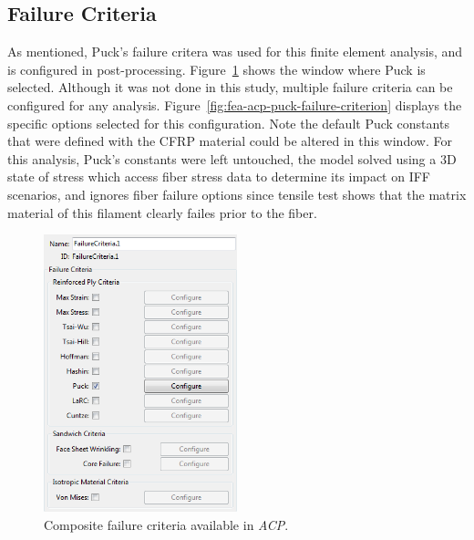 \clearpage

\subsection{Failure Criteria}

\indent

As mentioned, Puck's failure critera was used for this finite element analysis, and is configured in post-processing. Figure~\ref{fig:fea-acp-failure-criteria-definition} shows the window where Puck is selected. Although it was not done in this study, multiple failure criteria can be configured for any analysis. Figure~\ref{fig:fea-acp-puck-failure-criterion} displays the specific options selected for this configuration. Note the default Puck constants that were defined with the CFRP material could be altered in this window. For this analysis, Puck's constants were left untouched, the model solved using a 3D state of stress which access fiber stress data to determine its impact on IFF scenarios, and ignores fiber failure options since tensile test shows that the matrix material of this filament clearly failes prior to the fiber.\\

\begin{figure}[htp]
\centering
\includegraphics[width=0.5\textwidth]{./figures/fea/fea-acp-failure-criteria-definition}
\caption{Composite failure criteria available in \textit{ACP}.}
\label{fig:fea-acp-failure-criteria-definition}
\end{figure}

